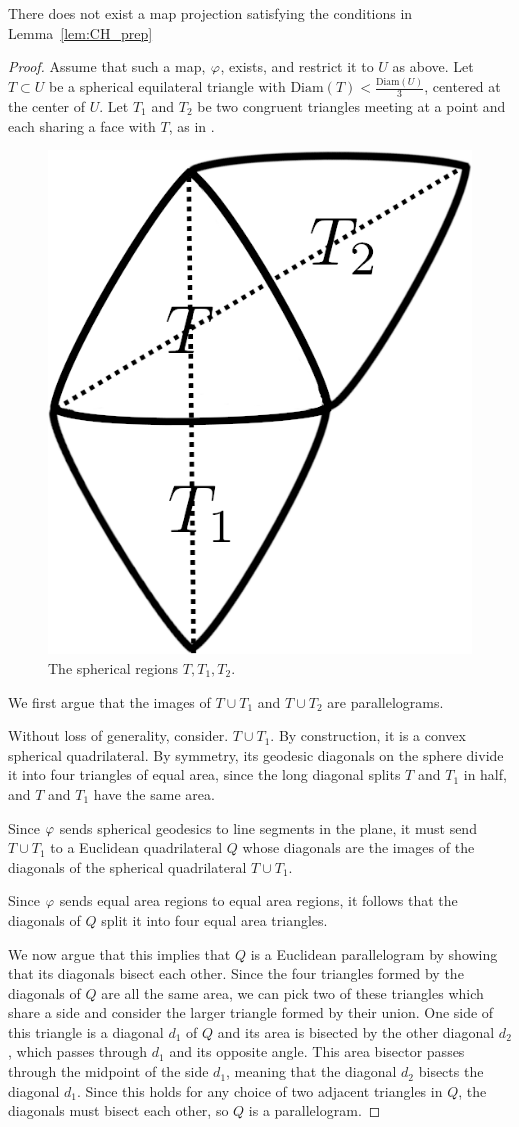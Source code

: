 \begin{theorem}
	There does not exist a map projection satisfying the 
	conditions in Lemma~\ref{lem:CH_prep}
\end{theorem}
\begin{proof}
	Assume that such a map, $\varphi$, exists, and restrict 
	it to $U$ as above. Let $T\subset U$ be a 
	spherical equilateral triangle with 
	$\mathrm{Diam}(T)<\frac{\mathrm{Diam}(U)}{3}$, centered at 
	the center of $U$. Let $T_1$ and $T_2$ be two 
	congruent triangles meeting at a point and 
	each sharing a face with $T$, as in .

\begin{figure}[h]
	\centering
	\includegraphics[width=.25\textwidth]{figs/spheretri.png}
	\caption{The spherical regions $T,T_1,T_2$.}
	\label{fig:sphtris}
\end{figure}












We first argue that the images of $T\cup T_1$ and $T\cup T_2$ are parallelograms.

Without loss of generality, consider. $T\cup T_1$.  By construction, it is a 
convex spherical quadrilateral. By symmetry, its geodesic 
diagonals on the sphere divide it into four triangles of equal area, since the long diagonal splits $T$ and $T_1$ in 
half, and $T$ and $T_1$ have the same area.


		Since $\varphi$ sends spherical geodesics to line segments in the plane, it must send 
		$T\cup T_1$ to a Euclidean quadrilateral $Q$ whose diagonals 
		are the images of the diagonals of the spherical quadrilateral $T\cup T_1$.
		
		 Since 
		$\varphi$ sends equal area regions to equal area 
		regions, it follows that the diagonals 
		of $Q$ split it into four equal area triangles.
		
		We now argue that this implies that $Q$ is a Euclidean parallelogram by showing that its diagonals bisect each other.  Since the four triangles 
		formed by the diagonals of $Q$ are all the same area, we can pick two of these triangles which share a side 
		and consider the larger triangle formed by their union.  One side of this triangle is a diagonal $d_1$ of $Q$ and its area is 
		bisected by the other diagonal $d_2$, which passes through $d_1$ and its opposite angle.  This area bisector passes through the midpoint of the side $d_1$, meaning that the diagonal $d_2$ bisects the diagonal $d_1$.  Since this holds for any choice of two adjacent triangles in $Q$, the diagonals must bisect each other, so $Q$ is a parallelogram.
		

\end{proof}
